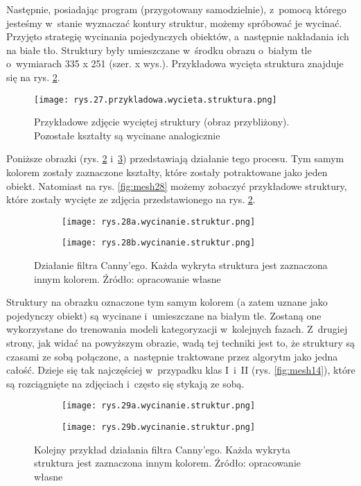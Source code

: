 Następnie, posiadając program (przygotowany samodzielnie), z~pomocą którego jesteśmy w~stanie wyznaczać kontury struktur, możemy spróbować je wycinać. Przyjęto strategię wycinania pojedynczych obiektów, a~następnie nakładania ich na białe tło. Struktury były umieszczane w~środku obrazu o~białym tle o~wymiarach 335 x 251 (szer. x wys.). Przykładowa wycięta struktura znajduje się na rys. \ref{fig:mesh26}.
\begin{figure}[h]
    \centering
    \texttt{[image: rys.27.przykladowa.wycieta.struktura.png]}
    \caption{Przykładowe zdjęcie wyciętej struktury (obraz przybliżony). Pozostałe kształty są wycinane analogicznie}
    \label{fig:mesh26}
\end{figure}
Poniższe obrazki (rys. \ref{fig:mesh26} i~\ref{fig:mesh27}) przedstawiają działanie tego procesu. Tym samym kolorem zostały zaznaczone kształty, które zostały potraktowane jako jeden obiekt. Natomiast na rys. \ref{fig:mesh28} możemy zobaczyć przykładowe struktury, które zostały wycięte ze zdjęcia przedstawionego na rys. \ref{fig:mesh26}. 
\begin{figure}[h]
	\centering
	\begin{subfigure}{0.29\textwidth}
	    \centering
	    \texttt{[image: rys.28a.wycinanie.struktur.png]}
	\end{subfigure}
	\begin{subfigure}{0.29\textwidth}
	    \centering
	    \texttt{[image: rys.28b.wycinanie.struktur.png]}
	\end{subfigure}
	\caption{\label{fig:mesh26}Działanie filtra Canny'ego. Każda wykryta struktura jest zaznaczona innym kolorem. Źródło: opracowanie własne}
\end{figure}
Struktury na obrazku oznaczone tym samym kolorem (a zatem uznane jako pojedynczy obiekt) są wycinane i~umieszczane na białym tle. Zostaną one wykorzystane do trenowania modeli kategoryzacji w~kolejnych fazach. Z~drugiej strony, jak widać na powyższym obrazie, wadą tej techniki jest to, że struktury są czasami ze sobą połączone, a~następnie traktowane przez algorytm jako jedna całość. Dzieje się tak najczęściej w~przypadku klas I~i~II (rys. \ref{fig:mesh14}), które są rozciągnięte na zdjęciach i~często się stykają ze sobą. 
\begin{figure}[h]
	\centering
	\begin{subfigure}{0.29\textwidth}
	    \centering
	    \texttt{[image: rys.29a.wycinanie.struktur.png]}
	\end{subfigure}
	\begin{subfigure}{0.29\textwidth}
	    \centering
	    \texttt{[image: rys.29b.wycinanie.struktur.png]}
	\end{subfigure}
	\caption{\label{fig:mesh27}Kolejny przykład działania filtra Canny'ego. Każda wykryta struktura jest zaznaczona innym kolorem. Źródło: opracowanie własne}
\end{figure}
